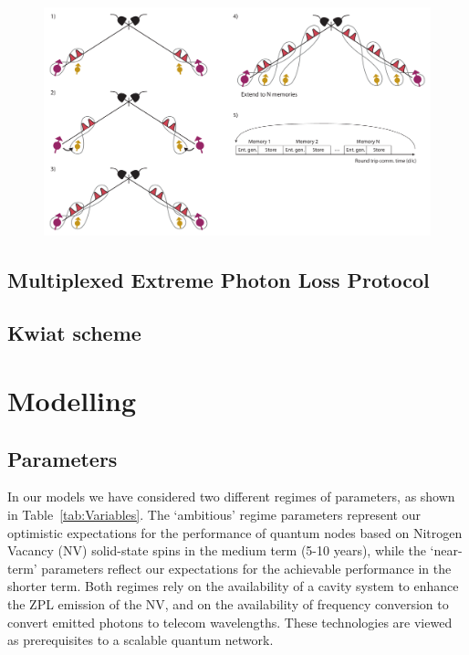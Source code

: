 \documentclass[aps,pra,superscriptaddress,preprint]{revtex4-1}
\begin{document}
\begin{figure}[htbp]
\begin{center}
\includegraphics[width=12.0cm]{MultiplexingDiagram.pdf}
\caption{}
\label{fig:MultiplexingDiagram}
\end{center}
\end{figure}

\subsection{Multiplexed Extreme Photon Loss Protocol}

\subsection{Kwiat scheme}

\section{Modelling}

\subsection{Parameters}
In our models we have considered two different regimes of parameters, as shown in Table~\ref{tab:Variables}. The `ambitious' regime parameters represent our optimistic expectations for the performance of quantum nodes based on Nitrogen Vacancy (NV) solid-state spins in the medium term (5-10 years), while the `near-term' parameters reflect our expectations for the achievable performance in the shorter term. Both regimes rely on the availability of a cavity system to enhance the ZPL emission of the NV, and on the availability of frequency conversion to convert emitted photons to telecom wavelengths. These technologies are viewed as prerequisites to a scalable quantum network.  
\end{document}
